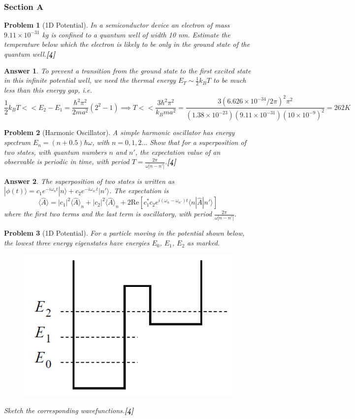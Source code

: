 \documentclass[a4paper]{article}
\newtheorem{ans}{Answer}[subsection]
\theoremstyle{new}
\newtheorem{qns}{Problem}[subsection]
\begin{document}
\subsubsection{Section A}
\begin{qns}[1D Potential]
In a semiconductor device an electron of mass $9.11 \times 10^{−31}$ kg is confined to a quantum well of width 10 nm. Estimate the temperature below which the electron is likely to be only in the ground state of the quantum well.\hfill\textbf{[4]}
\end{qns}
\begin{ans}
To prevent a transition from the ground state to the first excited state in this infinite potential well, we need the thermal energy $E_T\sim\frac{1}{2}k_BT$ to be much less than this energy gap, i.e.
$$\frac{1}{2}k_BT<<E_2-E_1=\frac{\hbar^2\pi^2}{2ma^2}(2^2-1)\implies T<<\frac{3\hbar^2\pi^2}{k_Bma^2}=\frac{3(6.626\times10^{-34}/2\pi)^2\pi^2}{(1.38\times10^{-23})(9.11\times10^{-31})(10\times10^{-9})^2}=262K$$
\end{ans}
\begin{qns}[Harmonic Oscillator]
A simple harmonic oscillator has energy spectrum $E_n=(n+0.5)\hbar\omega$, with $n = 0, 1, 2 . . .$ Show that for a superposition of two states, with quantum numbers $n$ and $n′$, the expectation value of an observable is periodic in time, with period $T =\frac{2\pi}{\omega|n-n'|}$.\hfill\textbf{[4]}
\end{qns}
\begin{ans}
The superposition of two states is written as $|\phi(t)\rangle=c_1e^{-i\omega_nt}|n\rangle+c_2e^{-i\omega_{n'}t}|n'\rangle$. The expectation is
$$\langle\hat{A}\rangle=|c_1|^2\langle\hat{A}\rangle_n+|c_2|^2\langle\hat{A}\rangle_n+2\text{Re}[c_1^*c_2e^{i(\omega_n-\omega_{n'})t}\langle n|\hat{A}|n'\rangle]$$
where the first two terms and the last term is oscillatory, with period $\frac{2\pi}{\omega|n-n'|}$.
\end{ans}
\begin{qns}[1D Potential]
For a particle moving in the potential shown below, the lowest three energy eigenstates have energies $E_0$, $E_1$, $E_2$ as marked.
\begin{figure}[H]
    \centering
    \includegraphics[scale=0.75]{2010P2A3Q.PNG}
\end{figure}
Sketch the corresponding wavefunctions.\hfill\textbf{[4]}
\end{qns}
\end{document}
